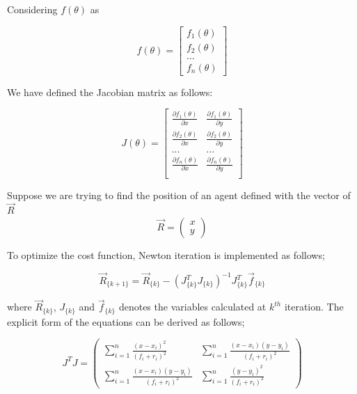 Considering  $f(\theta)$ as

\begin{equation}
f(\theta) = \begin{bmatrix}
f_1(\theta) \\
f_2(\theta) \\
...         \\
f_n(\theta)
\end{bmatrix}
\end{equation}


We have defined the Jacobian matrix as follows:

\begin{equation}
J(\theta) = \begin{bmatrix}
\frac{\partial{f_1(\theta)}}{\partial{x}} & \frac{\partial{f_1(\theta)}}{\partial{y}} \\
\frac{\partial{f_2(\theta)}}{\partial{x}} & \frac{\partial{f_2(\theta)}}{\partial{y}} \\
... & ... \\
\frac{\partial{f_n(\theta)}}{\partial{x}} & \frac{\partial{f_n(\theta)}}{\partial{y}} \\
\end{bmatrix}
\end{equation}

	
Suppose we are trying to find the position of an agent defined with the vector of $\vec{R}$	
\begin{equation}
 \vec{R} = \left(\begin{matrix}
  x \\ y 
 \end{matrix}\right)
\end{equation}

To optimize the cost function, Newton iteration is implemented as follows;

\begin{equation}
 \vec{R}_{\{k+1\}} =  \vec{R}_{\{k\}} - (J^T_{\{k\}}J_{\{k\}})^{-1}J^T_{\{k\}}\vec{f}_{\{k\}}
\end{equation}	

where $\vec{R}_{\{k\}}$, $J_{\{k\}}$ and $\vec{f}_{\{k\}}$ denotes the variables calculated at $k^{th}$ iteration. The explicit form of the equations can be derived as follows;
	
\begin{equation}
J^TJ = \left(\begin{matrix}
\sum_{i=1}^{n} \frac{(x-x_i)^2}{(f_i+r_i)^2} &  \sum_{i=1}^{n} \frac{(x-x_i)(y-y_i)}{(f_i+r_i)^2} \\
\sum_{i=1}^{n} \frac{(x-x_i)(y-y_i)}{(f_i+r_i)^2} &  \sum_{i=1}^{n} \frac{(y-y_i)^2}{(f_i+r_i)^2}
\end{matrix}\right)
\end{equation}	


